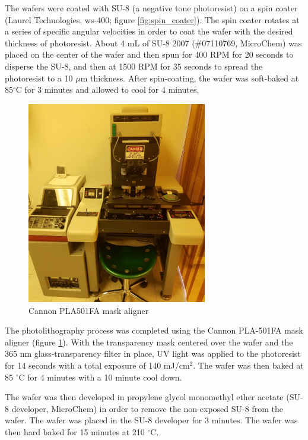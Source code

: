 \par The wafers were coated with SU-8 (a negative tone photoresist) on a spin coater (Laurel Technologies, ws-400; figure \ref{fig:spin_coater}). The spin coater rotates at a series of specific angular velocities in order to coat the wafer with the desired thickness of photoresist. About 4 mL of SU-8 2007 (\#07110769, MicroChem) was placed on the center of the wafer and then spun for 400 RPM for 20 seconds to disperse the SU-8, and then at 1500 RPM for 35 seconds to spread the photoresist to a 10 $\mu$m thickness. After spin-coating, the wafer was soft-baked at 85$^\circ$C for 3 minutes and allowed to cool for 4 minutes.

\begin{figure}[h]
    \centering
    \includegraphics[width=0.7\textwidth]{images/aligner.jpg}
    \caption{Cannon PLA501FA mask aligner}
    \label{fig:mask_aligner}
\end{figure}

\par The photolithography process was completed using the Cannon PLA-501FA mask aligner (figure \ref{fig:mask_aligner}). With the transparency mask centered over the wafer and the 365 nm glass-transparency filter in place, UV light was applied to the photoresist for 14 seconds with a total exposure of 140 mJ/cm$^2$. The wafer was then baked at 85 $^\circ$C for 4 minutes with a 10 minute cool down. 

\par The wafer was then developed in propylene glycol monomethyl ether acetate (SU-8 developer, MicroChem) in order to remove the non-exposed SU-8 from the wafer. The wafer was placed in the SU-8 developer for 3 minutes. The wafer was then hard baked for 15 minutes at 210 $^\circ$C. 

